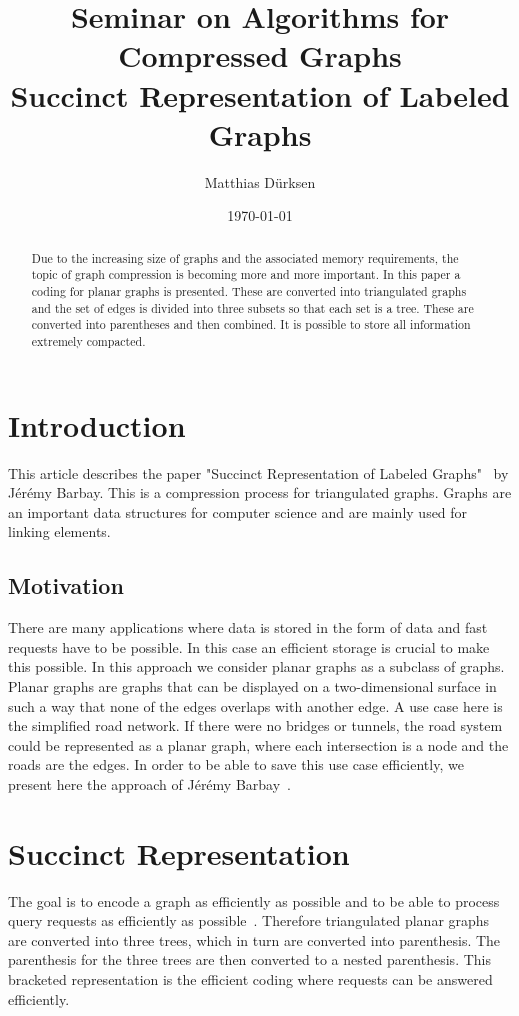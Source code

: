 \documentclass[a4paper]{scrartcl}
\title{Seminar on Algorithms for Compressed Graphs \\ Succinct Representation of Labeled Graphs}
\author{Matthias Dürksen}
\date{\today}
\begin{document}
\maketitle

\begin{abstract}
	Due to the increasing size of graphs and the associated memory requirements, the topic of graph compression is becoming more and more important. In this paper a coding for planar graphs is presented. These are converted into triangulated graphs and the set of edges is divided into three subsets so that each set is a tree. These are converted into parentheses and then combined. It is possible to store all information extremely compacted.
\end{abstract}


\section{Introduction}\label{sec:introduction}
This article describes the paper "Succinct Representation of Labeled Graphs"~\cite{SuccinctRepresentation} by Jérémy Barbay. This is a compression process for triangulated graphs. Graphs are an important data structures for computer science and are mainly used for linking elements.


\subsection{Motivation}


There are many applications where data is stored in the form of data and fast requests have to be possible. In this case an efficient storage is crucial to make this possible. In this approach we consider planar graphs as a subclass of graphs. Planar graphs are graphs that can be displayed on a two-dimensional surface in such a way that none of the edges overlaps with another edge. A use case here is the simplified road network. If there were no bridges or tunnels, the road system could be represented as a planar graph, where each intersection is a node and the roads are the edges. In order to be able to save this use case efficiently, we present here the approach of Jérémy Barbay~\cite{SuccinctRepresentation}.






\section{Succinct Representation}
The goal is to encode a graph as efficiently as possible and to be able to process query requests as efficiently as possible~\cite{SuccinctRepresentation}. Therefore triangulated planar graphs are converted into three trees, which in turn are converted into parenthesis. The parenthesis for the three trees are then converted to a nested parenthesis. This bracketed representation is the efficient coding where requests can be answered efficiently.
\end{document}
